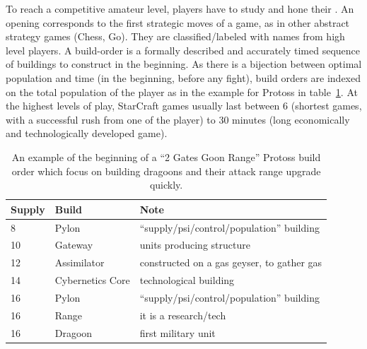 To reach a competitive amateur level, players have to study \textit{} and hone their \textit{}. An opening corresponds to the first strategic moves of a game, as in other abstract strategy games (Chess, Go). They are classified/labeled with names from high level players. A build-order is a formally described and accurately timed sequence of buildings to construct in the beginning. As there is a bijection between optimal population and time (in the beginning, before any fight), build orders are indexed on the total population of the player as in the example for Protoss in table~\ref{bo:two_gates_goon_range}. 
At the highest levels of play, StarCraft games usually last between 6 (shortest games, with a successful rush from one of the player) to 30 minutes (long economically and technologically developed game).
\begin{table}
\begin{center}
\begin{tabular}{|l|l|l|}
\hline
Supply & Build & Note \\
\hline
8 & Pylon & ``supply/psi/control/population'' building \\
10 & Gateway & units producing structure \\
12 & Assimilator & constructed on a gas geyser, to gather gas \\
14 & Cybernetics Core & technological building \\
16 & Pylon & ``supply/psi/control/population'' building \\
16 & Range & it is a research/tech \\
16 & Dragoon & first military unit \\
\hline
\end{tabular}
\end{center}
\caption{An example of the beginning of a ``2 Gates Goon Range'' Protoss build order which focus on building dragoons and their attack range upgrade quickly.}
\label{bo:two_gates_goon_range}
\end{table}

